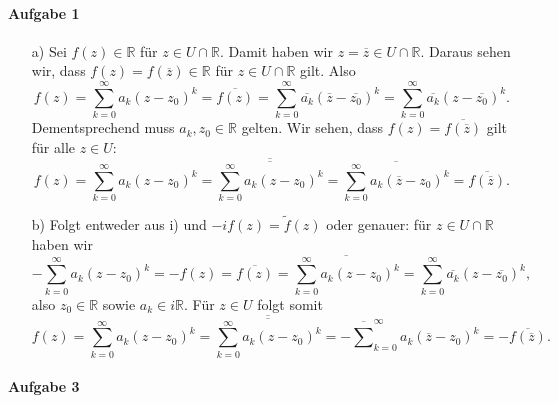 \documentclass[11pt,a4paper]{article}
\theoremstyle{definition} \newtheorem{theo}{Theorem}[section]
\theoremstyle{definition} \newtheorem{defi}{Definition}[section]
\theoremstyle{definition} \newtheorem{cor}{Corollary}[section]
\theoremstyle{definition} \newtheorem{lemmas}{Lemma}[section]
\theoremstyle{definition} \newtheorem{assp}{Assumption}[section]
\theoremstyle{definition} \newtheorem{exam}{Example}[section]
\theoremstyle{definition} \newtheorem{sol}{Lösung}
\begin{document}
\paragraph{Aufgabe 1}
\begin{itemize}
	\item[a)] Sei $f(z)\in \mathbb{R}$ für $z\in U\cap \mathbb{R}$. Damit haben wir $z=\overline{z}\in U\cap \mathbb{R}$. Daraus sehen wir, dass $f(z)=f(\overline{z})\in \mathbb{R}$ für $z\in U\cap \mathbb{R}$ gilt. Also
	\begin{equation*}
	f(z)=\sum_{k=0}^{\infty}a_{k}(z-z_{0})^{k}=\overline{f(z)}=\sum_{k=0}^{\infty}\overline{a_{k}}(\overline{z}-\overline{z_{0}})^k=\sum_{k=0}^{\infty}\overline{a_{k}}(z-\overline{z_{0}})^k.
	\end{equation*}
	Dementsprechend muss $a_{k},z_{0}\in \mathbb{R}$ gelten. Wir sehen, dass $f(z)= \overline{f(\overline{z})}$ gilt für alle $z\in U$:
	\begin{equation*}
	f(z)=\sum_{k=0}^{\infty}a_{k}(z-z_{0})^{k}=\overline{\overline{\sum_{k=0}^{\infty}a_{k}(z-z_{0})^{k}}}=\overline{\sum_{k=0}^{\infty}a_{k}(\overline{z}-z_{0})^{k}}=\overline{f(\overline{z})}.
	\end{equation*}
	\item[b)] Folgt entweder aus i) und $-if(z)=\tilde{f}(z)$ oder genauer: für $z\in U\cap \mathbb{R}$ haben wir
	\begin{equation*}
	-\sum_{k=0}^{\infty}a_{k}(z-z_{0})^{k}=-f(z)=\overline{f(z)}=\overline{\sum_{k=0}^{\infty}a_{k}(z-z_{0})^{k}}= \sum_{k=0}^{\infty}\overline{a_{k}}(z-\overline{z_{0}})^{k},
	\end{equation*}
	also $z_{0}\in\mathbb{R}$ sowie $a_{k}\in i\mathbb{R}$. Für $z\in U$ folgt somit
	\begin{equation*}
	f(z)=\sum_{k=0}^{\infty}a_{k}(z-z_{0})^{k}=\overline{\overline{\sum_{k=0}^{\infty}a_{k}(z-z_{0})^{k}}}=-\overline \sum_{k=0}^{\infty}a_{k}(\overline{z}-z_{0})^{k}=-\overline{f(\overline{z})}.
	\end{equation*}
\end{itemize}

\paragraph{Aufgabe 3}
\end{document}
